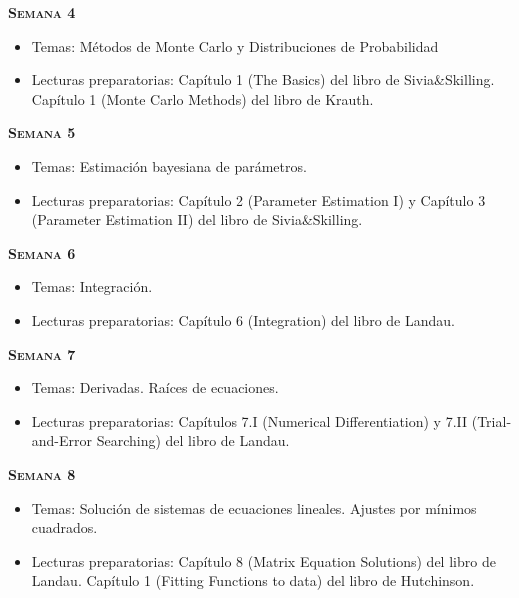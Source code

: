 \documentclass[letterpaper,10pt,onecolumn]{article}
\begin{document}
\noindent\textbf{\textsc{Semana 4}}\\[-0.5cm]
\begin{itemize}
\item Temas: M\'etodos de Monte Carlo y Distribuciones de Probabilidad\\[-0.6cm]
\item Lecturas preparatorias:  Cap\'itulo 1 (The Basics) del libro de
  Sivia\&Skilling.  Cap\'itulo 1 (Monte Carlo Methods) del
  libro de Krauth.\\[-0.6cm]
\end{itemize}

\noindent\textbf{\textsc{Semana 5}}\\[-0.5cm]
\begin{itemize}
\item Temas: Estimaci\'on bayesiana de par\'ametros. \\[-0.6cm]
\item Lecturas preparatorias:  Cap\'itulo 2 (Parameter Estimation I) y
  Cap\'itulo 3 (Parameter Estimation II) del libro de 
  Sivia\&Skilling. \\[-0.6cm]
\end{itemize}

\noindent\textbf{\textsc{Semana 6}}\\[-0.5cm]
\begin{itemize}
\item Temas: Integraci\'on. \\[-0.6cm]
\item Lecturas preparatorias: Cap\'itulo 6 (Integration) del libro de
Landau.\\[-0.6cm]
\end{itemize}

\noindent\textbf{\textsc{Semana 7}}\\[-0.5cm]
\begin{itemize}
\item Temas: Derivadas. Ra\'ices de ecuaciones. \\[-0.6cm]
\item Lecturas preparatorias: Cap\'itulos 7.I (Numerical
  Differentiation) y 7.II (Trial-and-Error Searching) del libro de
  Landau.\\[-0.6cm] 
\end{itemize}

\noindent\textbf{\textsc{Semana 8}}\\[-0.5cm]
\begin{itemize}
\item Temas: Soluci\'on de sistemas de ecuaciones lineales. Ajustes
  por m\'inimos cuadrados. \\[-0.6cm] 
\item Lecturas preparatorias:  Cap\'itulo 8 (Matrix Equation Solutions)
  del libro de Landau. Cap\'itulo 1 (Fitting Functions to data) del
  libro de Hutchinson.\\[-0.6cm] 
\end{itemize}
\end{document}

